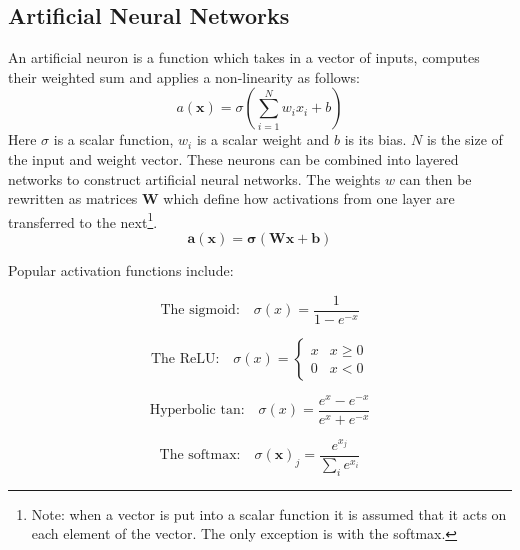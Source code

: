 \documentclass[11pt,twoside]{report}
\begin{document}
\subsection{Artificial Neural Networks}
An artificial neuron is a function which takes in a vector of inputs, computes their
weighted sum and applies a non-linearity as follows:
\begin{equation}
    a(\mathbf{x}) = \sigma \left ( \sum_{i=1}^N w_ix_i + b \right )
\end{equation}
Here $\sigma$ is a scalar function, $w_i$ is a scalar weight and $b$ is its bias. $N$ is the size of the input and weight vector.
These neurons can be combined into layered networks to construct artificial neural networks.
The weights $w$ can then be rewritten as matrices $\mathbf{W}$ which define how
activations from one layer are transferred to the next\footnote{Note: when a vector
is put into a scalar function it is assumed that it acts on each element of
the vector. The only exception is with the softmax.}.
\begin{equation}
    \mathbf{a}(\mathbf{x}) = \mathbf{\sigma} \left ( \mathbf{W}\mathbf{x} + \mathbf{b} \right ) \label{eq:softmax}
\end{equation}

Popular activation functions include:
\begin{multicols}{2}


\begin{equation}
\text{The sigmoid:}\quad
  \sigma (x) = \frac{1}{1-e^{-x}} \label{eq:sigmoid}
\end{equation}


\begin{equation}
\text{The ReLU:}\quad
\sigma(x) =
\begin{cases}
      x & x\geq 0 \\
      0 & x < 0
   \end{cases}
\end{equation}


\begin{equation}
\text{Hyperbolic tan:}\quad
    \sigma(x)=\frac{e^x - e^{-x}}{e^x + e^{-x}}
\end{equation}


\begin{equation}
\text{The softmax:}\quad
  \sigma(\mathbf{x})_j = \frac{e^{x_j}}{\sum_i e^{x_i}}
\end{equation}


\end{multicols}
\end{document}
